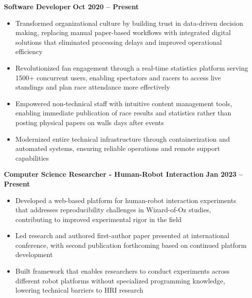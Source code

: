 \documentclass{article}
\begin{document}





 \hfill {}

\textbf{Software Developer} \hfill \textbf{Oct 2020 – Present}
\begin{itemize}[noitemsep,topsep=2pt]
\item Transformed organizational culture by building trust in data-driven decision making, replacing manual paper-based workflows with integrated digital solutions that eliminated processing delays and improved operational efficiency
\item Revolutionized fan engagement through a real-time statistics platform serving 1500+ concurrent users, enabling spectators and racers to access live standings and plan race attendance more effectively
\item Empowered non-technical staff with intuitive content management tools, enabling immediate publication of race results and statistics rather than posting physical papers on walls days after events
\item Modernized entire technical infrastructure through containerization and automated systems, ensuring reliable operations and remote support capabilities
\end{itemize}

 \hfill {}

\textbf{Computer Science Researcher - Human-Robot Interaction} \hfill \textbf{Jan 2023 – Present}
\begin{itemize}[noitemsep,topsep=2pt]
    \item Developed a web-based platform for human-robot interaction experiments that addresses reproducibility challenges in Wizard-of-Oz studies, contributing to improved experimental rigor in the field
    \item Led research and authored first-author paper presented at international conference, with second publication forthcoming based on continued platform development
    \item Built framework that enables researchers to conduct experiments across different robot platforms without specialized programming knowledge, lowering technical barriers to HRI research
\end{itemize}
\end{document}
